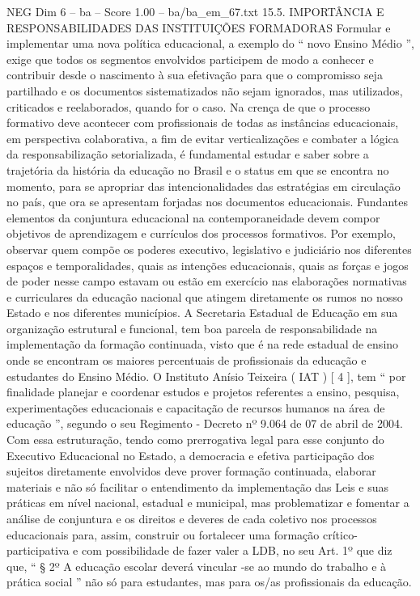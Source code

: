 \begin{textsample}{NEG Dim 6 – ba – Score 1.00 – ba/ba\_em\_67.txt}  \label{ex:f6_neg_217}
15.5.
IMPORTÂNCIA E RESPONSABILIDADES DAS INSTITUIÇÕES FORMADORAS Formular e implementar uma nova política educacional, a exemplo do “ novo Ensino Médio ”, exige que todos os segmentos envolvidos participem de modo a conhecer e contribuir desde o nascimento à sua efetivação para que o compromisso seja partilhado e os documentos sistematizados não sejam ignorados, mas utilizados, criticados e reelaborados, quando for o caso.
Na crença de que o processo formativo deve acontecer com profissionais de todas as instâncias educacionais, em perspectiva colaborativa, a fim de evitar verticalizações e combater a lógica da responsabilização setorializada, é fundamental estudar e saber sobre a trajetória da história da educação no Brasil e o status em que se encontra no momento, para se apropriar das intencionalidades das estratégias em circulação no país, que ora se apresentam forjadas nos documentos educacionais.
Fundantes elementos da conjuntura educacional na contemporaneidade devem compor objetivos de aprendizagem e currículos dos processos formativos.
Por exemplo, observar quem compõe os poderes executivo, legislativo e judiciário nos diferentes espaços e temporalidades, quais as intenções educacionais, quais as forças e jogos de poder nesse campo estavam ou estão em exercício nas elaborações normativas e curriculares da educação nacional que atingem diretamente os rumos no nosso Estado e nos diferentes municípios.
A Secretaria Estadual de Educação em sua organização estrutural e funcional, tem boa parcela de responsabilidade na implementação da formação continuada, visto que é na rede estadual de ensino onde se encontram os maiores percentuais de profissionais da educação e estudantes do Ensino Médio.
O Instituto Anísio Teixeira ( IAT ) [ 4 ], tem “ por finalidade planejar e coordenar estudos e projetos referentes a ensino, pesquisa, experimentações educacionais e capacitação de recursos humanos na área de educação ”, segundo o seu Regimento - Decreto nº 9.064 de 07 de abril de 2004.
Com essa estruturação, tendo como prerrogativa legal para esse conjunto do Executivo Educacional no Estado, a democracia e efetiva participação dos sujeitos diretamente envolvidos deve prover formação continuada, elaborar materiais e não só facilitar o entendimento da implementação das Leis e suas práticas em nível nacional, estadual e municipal, mas problematizar e fomentar a análise de conjuntura e os direitos e deveres de cada coletivo nos processos educacionais para, assim, construir ou fortalecer uma formação crítico-participativa e com possibilidade de fazer valer a LDB, no seu Art. 1º que diz que, “ § 2º A educação escolar deverá vincular -se ao mundo do trabalho e à prática social ” não só para estudantes, mas para os/as profissionais da educação.

\end{textsample}
